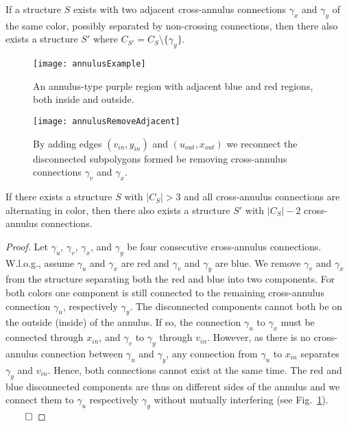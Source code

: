 \documentclass[runningheads]{llncs}
\begin{document}
\begin{lemma}
\label{lem:alternatingColors}
If a structure $S$ exists with two adjacent cross-annulus connections $\gamma_x$ and $\gamma_y$ of the same color, possibly separated by non-crossing connections, then there also exists a structure $S'$ where $C_{S'}=C_S\setminus \{\gamma_y\}$.
\end{lemma}

\begin{figure}[t]
\begin{minipage}[t]{.38\textwidth}
	\centering
	\texttt{[image: annulusExample]}
		\caption{An annulus-type purple region with adjacent blue and red regions, both inside and outside.}
		\label{fig:annulusExample}
\end{minipage}
\hfill
\begin{minipage}[t]{.59\textwidth}
	\centering
	\texttt{[image: annulusRemoveAdjacent]}
		\caption{By adding edges $(v_{in},y_{in})$ and $(u_{out},x_{out})$ we reconnect the disconnected subpolygons formed be removing cross-annulus connections $\gamma_v$ and $\gamma_x$.}
		\label{fig:annulusRemoveAdjacent}
\end{minipage}		
\end{figure}

\begin{lemma}
\label{lem:remove2}
If there exists a structure $S$ with $|C_S|>3$ and all cross-annulus connections are alternating in color, then there also exists a structure $S'$ with $|C_S|-2$ cross-annulus connections.
\end{lemma}

\begin{proof}
Let $\gamma_u$, $\gamma_v$, $\gamma_x$, and $\gamma_y$ be four consecutive cross-annulus connections. W.l.o.g., assume $\gamma_u$ and $\gamma_x$ are red and $\gamma_v$ and $\gamma_y$ are blue.
We remove $\gamma_v$ and $\gamma_x$ from the structure separating both the red and blue into two components.
For both colors one component is still connected to the remaining cross-annulus connection $\gamma_u$, respectively $\gamma_y$.
The disconnected components cannot both be on the outside (inside) of the annulus.
If so, the connection $\gamma_u$ to $\gamma_x$ must be connected through $x_{in}$, and $\gamma_v$ to $\gamma_y$ through $v_{in}$.
However, as there is no cross-annulus connection between $\gamma_u$ and $\gamma_y$, any connection from $\gamma_u$ to $x_{in}$ separates $\gamma_y$ and $v_{in}$. Hence, both connections cannot exist at the same time.
The red and blue disconnected components are thus on different sides of the annulus and we connect them to $\gamma_u$ respectively $\gamma_y$ without mutually interfering (see Fig.~\ref{fig:annulusRemoveAdjacent}).
\hfill $\qed$
\end{proof}
\end{document}
